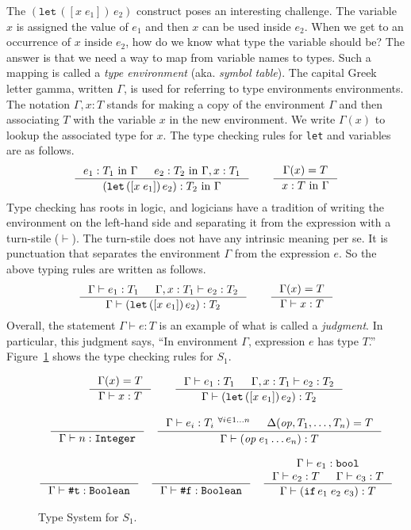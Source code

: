 \documentclass[12pt]{book}
\newcommand{\itm}[1]{\ensuremath{\mathit{#1}}}
\newcommand{\Op}{\itm{op}}
\newcommand{\key}[1]{\texttt{#1}}
\newcommand{\LET}[3]{(\key{let}\,([#1\;#2])\,#3)}
\newcommand{\IF}[3]{(\key{if}\,#1\;#2\;#3)}
\begin{document}
The $\LET{x}{e_1}{e_2}$ construct poses an interesting challenge. The
variable $x$ is assigned the value of $e_1$ and then $x$ can be used
inside $e_2$. When we get to an occurrence of $x$ inside $e_2$, how do
we know what type the variable should be?  The answer is that we need
a way to map from variable names to types.  Such a mapping is called a
\emph{type environment} (aka. \emph{symbol table}). The capital Greek
letter gamma, written $\Gamma$, is used for referring to type
environments environments. The notation $\Gamma, x : T$ stands for
making a copy of the environment $\Gamma$ and then associating $T$
with the variable $x$ in the new environment.  We write $\Gamma(x)$ to
lookup the associated type for $x$.  The type checking rules for
\key{let} and variables are as follows.
\begin{equation*}
  \inference{e_1 : T_1 \text{ in } \Gamma &
             e_2 : T_2 \text{ in } \Gamma,x:T_1}
            {\LET{x}{e_1}{e_2} : T_2 \text{ in } \Gamma} 
  \qquad
  \inference{\Gamma(x) = T}
            {x : T \text{ in } \Gamma}
\end{equation*}
Type checking has roots in logic, and logicians have a tradition of
writing the environment on the left-hand side and separating it from
the expression with a turn-stile ($\vdash$).  The turn-stile does not
have any intrinsic meaning per se.  It is punctuation that separates
the environment $\Gamma$ from the expression $e$.  So the above typing
rules are written as follows.
\begin{equation*}
  \inference{\Gamma \vdash e_1 : T_1 &
             \Gamma,x:T_1 \vdash e_2 : T_2}
            {\Gamma \vdash \LET{x}{e_1}{e_2} : T_2} 
   \qquad
  \inference{\Gamma(x) = T}
            {\Gamma \vdash x : T}
\end{equation*}
Overall, the statement $\Gamma \vdash e : T$ is an example of what is
called a \emph{judgment}.  In particular, this judgment says, ``In
environment $\Gamma$, expression $e$ has type $T$.''
Figure~\ref{fig:S1-type-system} shows the type checking rules for
$S_1$.

\begin{figure}
\begin{gather*}
  \inference{\Gamma(x) = T}
            {\Gamma \vdash x : T}
   \qquad
  \inference{\Gamma \vdash e_1 : T_1 &
             \Gamma,x:T_1 \vdash e_2 : T_2}
            {\Gamma \vdash \LET{x}{e_1}{e_2} : T_2} 
  \\[2ex]
  \inference{}{\Gamma \vdash n : \key{Integer}}
  \quad
  \inference{\Gamma \vdash e_i : T_i \ ^{\forall i \in 1\ldots n} & \Delta(\Op,T_1,\ldots,T_n) = T}
            {\Gamma \vdash (\Op \; e_1 \ldots e_n) : T}
  \\[2ex]
  \inference{}{\Gamma \vdash \key{\#t} : \key{Boolean}}
  \quad
  \inference{}{\Gamma \vdash \key{\#f} : \key{Boolean}}
  \quad
  \inference{\Gamma \vdash e_1 : \key{bool} \\
             \Gamma \vdash e_2 : T &
             \Gamma \vdash e_3 : T}
  {\Gamma \vdash \IF{e_1}{e_2}{e_3} : T}
\end{gather*}
\caption{Type System for $S_1$.}
\label{fig:S1-type-system}
\end{figure}
\end{document}
